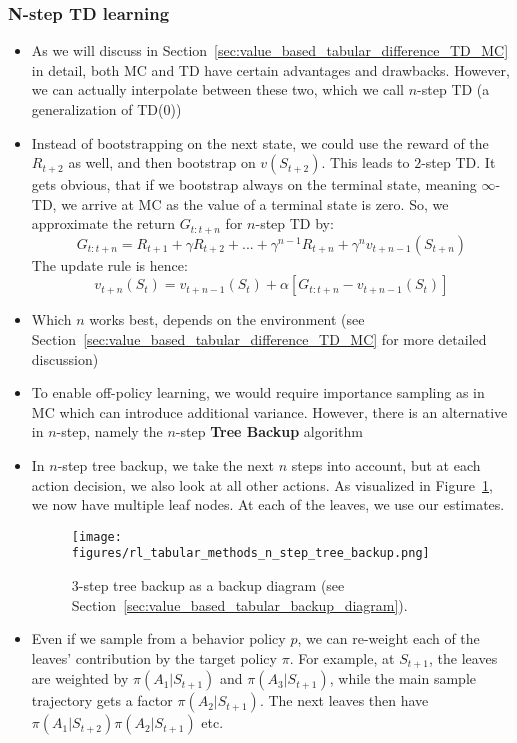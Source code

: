 \subsubsection{N-step TD learning}
\begin{itemize}
	\item As we will discuss in Section~\ref{sec:value_based_tabular_difference_TD_MC} in detail, both MC and TD have certain advantages and drawbacks. However, we can actually interpolate between these two, which we call $n$-step TD (a generalization of TD(0))
	\item Instead of bootstrapping on the next state, we could use the reward of the $R_{t+2}$ as well, and then bootstrap on $v(S_{t+2})$. This leads to $2$-step TD. It gets obvious, that if we bootstrap always on the terminal state, meaning $\infty$-TD, we arrive at MC as the value of a terminal state is zero. So, we approximate the return $G_{t:t+n}$ for $n$-step TD by:
	$$G_{t:t+n} = R_{t+1}+\gamma R_{t+2} + ... + \gamma^{n-1}R_{t+n} + \gamma^n v_{t+n-1}(S_{t+n})$$
	The update rule is hence:
	$$v_{t+n}(S_t) = v_{t+n-1}(S_t) + \alpha \left[G_{t:t+n}- v_{t+n-1}(S_t)\right]$$
	\item Which $n$ works best, depends on the environment (see Section~\ref{sec:value_based_tabular_difference_TD_MC} for more detailed discussion)
	\item To enable off-policy learning, we would require importance sampling as in MC which can introduce additional variance. However, there is an alternative in $n$-step, namely the $n$-step \textbf{Tree Backup} algorithm
	\item In $n$-step tree backup, we take the next $n$ steps into account, but at each action decision, we also look at all other actions. As visualized in Figure~\ref{fig:rl_tabular_methods_n_step_tree_backup}, we now have multiple leaf nodes. At each of the leaves, we use our estimates.
	\begin{figure}[ht!]
		\centering
		\texttt{[image: figures/rl\_tabular\_methods\_n\_step\_tree\_backup.png]}
		\caption{3-step tree backup as a backup diagram (see Section~\ref{sec:value_based_tabular_backup_diagram}).}
		\label{fig:rl_tabular_methods_n_step_tree_backup}
	\end{figure}
	\item Even if we sample from a behavior policy $p$, we can re-weight each of the leaves' contribution by the target policy $\pi$. For example, at $S_{t+1}$, the leaves are weighted by $\pi(A_1|S_{t+1})$ and $\pi(A_3|S_{t+1})$, while the main sample trajectory gets a factor $\pi(A_2|S_{t+1})$. The next leaves then have $\pi(A_1|S_{t+2})\pi(A_2|S_{t+1})$ etc.

\end{itemize}
